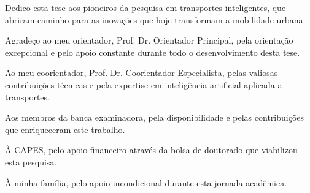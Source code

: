 \documentclass[doutorado,onehalfspacing,12pt,hyperref]{UnB-PPGT}
\begin{document}
\pretextual

\capa
\folhaderosto
\folhadeaprovacao
\fichacatalografica

\begin{dedicatoria}
Dedico esta tese aos pioneiros da pesquisa em transportes inteligentes, que abriram caminho para as inovações que hoje transformam a mobilidade urbana.
\end{dedicatoria}

\begin{agradecimentos}
Agradeço ao meu orientador, Prof. Dr. Orientador Principal, pela orientação excepcional e pelo apoio constante durante todo o desenvolvimento desta tese.

Ao meu coorientador, Prof. Dr. Coorientador Especialista, pelas valiosas contribuições técnicas e pela expertise em inteligência artificial aplicada a transportes.

Aos membros da banca examinadora, pela disponibilidade e pelas contribuições que enriqueceram este trabalho.

À CAPES, pelo apoio financeiro através da bolsa de doutorado que viabilizou esta pesquisa.

À minha família, pelo apoio incondicional durante esta jornada acadêmica.
\end{agradecimentos}
\end{document}
